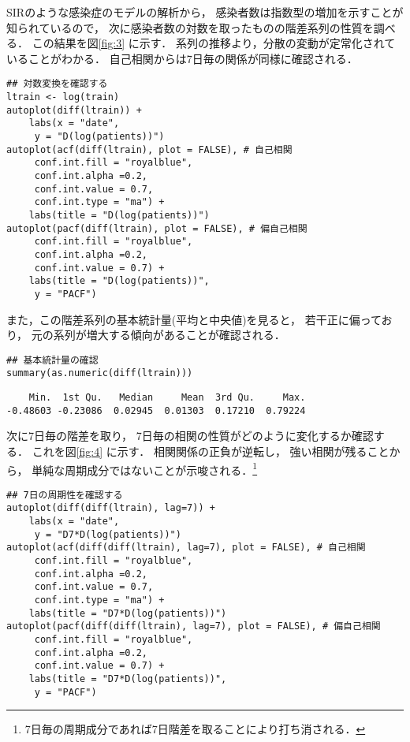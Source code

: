 \documentclass[10pt,oneside,fleqn]{scrartcl}
\begin{document}
SIRのような感染症のモデルの解析から，
感染者数は指数型の増加を示すことが知られているので，
次に感染者数の対数を取ったものの階差系列の性質を調べる．
この結果を図\ref{fig:3} に示す．
系列の推移より，分散の変動が定常化されていることがわかる．
自己相関からは7日毎の関係が同様に確認される．

\begin{figure*}[htbp]
  \centering
\end{figure*}

\begin{verbatim}
## 対数変換を確認する
ltrain <- log(train)
autoplot(diff(ltrain)) +
    labs(x = "date",
	 y = "D(log(patients))")
autoplot(acf(diff(ltrain), plot = FALSE), # 自己相関
	 conf.int.fill = "royalblue",
	 conf.int.alpha =0.2,
	 conf.int.value = 0.7,
	 conf.int.type = "ma") +
    labs(title = "D(log(patients))")
autoplot(pacf(diff(ltrain), plot = FALSE), # 偏自己相関
	 conf.int.fill = "royalblue",
	 conf.int.alpha =0.2,
	 conf.int.value = 0.7) +
    labs(title = "D(log(patients))",
	 y = "PACF")
\end{verbatim}

また，この階差系列の基本統計量(平均と中央値)を見ると，
若干正に偏っており，
元の系列が増大する傾向があることが確認される．

\begin{verbatim}
## 基本統計量の確認
summary(as.numeric(diff(ltrain)))
\end{verbatim}

\begin{verbatim}
    Min.  1st Qu.   Median     Mean  3rd Qu.     Max. 
-0.48603 -0.23086  0.02945  0.01303  0.17210  0.79224
\end{verbatim}


次に7日毎の階差を取り，
7日毎の相関の性質がどのように変化するか確認する．
これを図\ref{fig:4} に示す．
相関関係の正負が逆転し，
強い相関が残ることから，
単純な周期成分ではないことが示唆される．\footnote{7日毎の周期成分であれば7日階差を取ることにより打ち消される．}

\begin{figure*}[htbp]
  \centering
\end{figure*}

\begin{verbatim}
## 7日の周期性を確認する
autoplot(diff(diff(ltrain), lag=7)) +
    labs(x = "date",
	 y = "D7*D(log(patients))")
autoplot(acf(diff(diff(ltrain), lag=7), plot = FALSE), # 自己相関
	 conf.int.fill = "royalblue",
	 conf.int.alpha =0.2,
	 conf.int.value = 0.7,
	 conf.int.type = "ma") +
    labs(title = "D7*D(log(patients))")
autoplot(pacf(diff(diff(ltrain), lag=7), plot = FALSE), # 偏自己相関
	 conf.int.fill = "royalblue",
	 conf.int.alpha =0.2,
	 conf.int.value = 0.7) +
    labs(title = "D7*D(log(patients))",
	 y = "PACF")
\end{verbatim}
\end{document}
